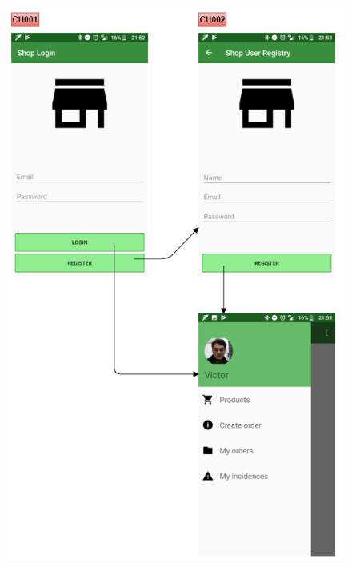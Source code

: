 \documentclass[11pt,spanish,listoffigures]{tfgetsinf}
\begin{document}
\begin{figure}[h]
\centering
\includegraphics[scale=0.85]{ModeloUI_Final1}
\end{figure}
\end{document}
